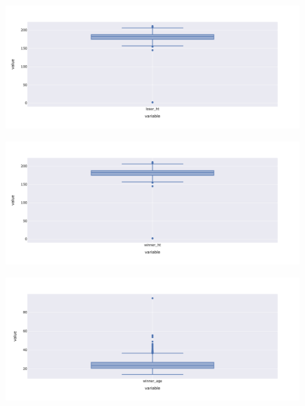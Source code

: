 \documentclass{article}
\begin{document}
\begin{figure}[h]
	\centering
	\begin{minipage}{.50\textwidth}
		\centering
		\includegraphics[width=\textwidth]{plots/loser_ht_boxplot.png}
		\label{fig:loser_ht_boxplot}
	\end{minipage}%
	\begin{minipage}{.50\textwidth}
		\centering
		\includegraphics[width=\textwidth]{plots/winner_ht_boxplot.png}
		\label{fig:winner_ht_boxplot}
	\end{minipage}
	\begin{minipage}{.50\textwidth}
		\centering
		\includegraphics[width=\textwidth]{plots/winner_age_boxplot.png}
		\label{fig:winner_age_boxplot}
	\end{minipage}
\end{figure}
\end{document}
